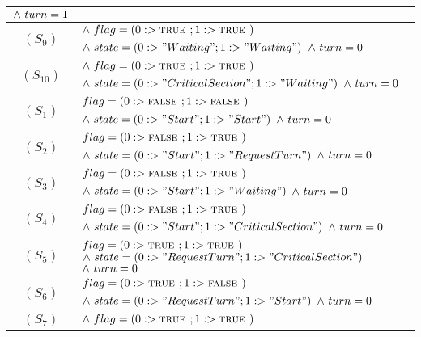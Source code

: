 \documentclass[fleqn]{tukseminar}
\begin{document}
\begin{center}
\begin{longtable}{ |c|p{10cm}| }
													$\land \  turn = 1$  \\ \hline
							\pa $(S_9)$   & $\land \  flag = (0 :> \mbox{\textsc{true }} ; 1 :> \mbox{\textsc{true }})$\newline
													$\land \  state = (0 :> "Waiting" ; 1 :> "Waiting")$\newline
													$\land \  turn = 0$  \\ \hline
							\pa $(S_{10})$   & $\land \  flag = (0 :> \mbox{\textsc{true }} ; 1 :> \mbox{\textsc{true }})$\newline
													$\land \  state = (0 :> "CriticalSection" ; 1 :> "Waiting")$\newline
													$\land \  turn = 0$  \\ \hline
							\pb $(S_1)$  & $flag = (0 :> \mbox{\textsc{false }}  ;  1 :> \mbox{\textsc{false }})$\newline
													$\land \  state = (0 :> "Start"  ;  1 :> "Start")$\newline
													$\land \  turn = 0$\\
							\hline
							\pb $(S_2)$   & $flag = (0 :> \mbox{\textsc{false }}  ;  1 :> \mbox{\textsc{true }})$\newline
													$\land \  state = (0 :> "Start"  ;  1 :> "RequestTurn")$\newline
													$\land \  turn = 0$  \\ \hline
							\pb $(S_3)$   & $flag = (0 :> \mbox{\textsc{false }}  ;  1 :> \mbox{\textsc{true }})$\newline
													$\land \  state = (0 :> "Start"  ;  1 :> "Waiting")$\newline
													$\land \  turn = 0$  \\ \hline
							\pb $(S_4)$   & $ flag = (0 :> \mbox{\textsc{false }} ; 1 :> \mbox{\textsc{true }})$\newline
													$\land \  state = (0 :> "Start" ; 1 :> "CriticalSection")$\newline
													$\land \  turn = 0$  \\ \hline
							\pb $(S_5)$   & $ flag = (0 :> \mbox{\textsc{true }} ; 1 :> \mbox{\textsc{true }})$\newline
													$\land \  state = (0 :> "RequestTurn" ; 1 :> "CriticalSection")$\newline
													$\land \  turn = 0$  \\ \hline
							\pb $(S_6)$   & $ flag = (0 :> \mbox{\textsc{true }} ; 1 :> \mbox{\textsc{false }})$\newline
													$\land \  state = (0 :> "RequestTurn" ; 1 :> "Start")$\newline
													$\land \  turn = 0$  \\ \hline
							\pb $(S_7)$   & $\land \  flag = (0 :> \mbox{\textsc{true }} ; 1 :> \mbox{\textsc{true }})$\newline

\end{longtable}
\end{center}
\end{document}
